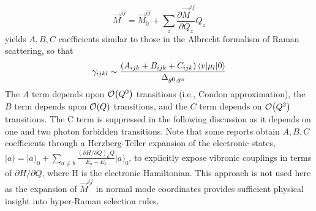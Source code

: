 \documentclass[aip, jcp, reprint, twocolumn]{revtex4-2}
\begin{document}
\begin{equation}
\vec{M}^{ij} = \vec{M}^{ij}_0 + \sum_z \frac{\partial\vec{M}^{ij}}{\partial Q_z} Q_z
\end{equation} 
yields $A, B, C$ coefficients similar to those in the Albrecht formalism of Raman scattering, \cite{Albrecht1961, Ziegler1988} so that
\begin{equation}
		\gamma_{ijkl} \sim \frac{(A_{ijk} + B_{ijk} + C_{ijk})\mel{v}{\mu_{l}}{0}} {\Delta_{g0,gv}}
\end{equation}
The $A$ term depends upon $\order{Q^0}$ transitions (i.e., Condon approximation), the $B$ term depends upon $\order{Q}$ transitions, and the $C$ term depends on $\order{Q^2}$ transitions. 
The C term is suppressed in the following discussion as it depends on one and two photon forbidden transitions. \cite{Ziegler1988, Neddersen1989, Bonang1992}
Note that some reports obtain $A, B, C$ coefficients through a Herzberg-Teller expansion of the electronic states, $|a) = |a)_0 + \sum_{a \neq b} \frac{(\partial H / \partial Q )_0  Q}{E_a - E_b} |a)_0$, to explicitly expose vibronic couplings in terms of $\partial H / \partial Q $, where H is the electronic Hamiltonian.\cite{HerzbergTeller1933, Petrov1985, Neddersen1989, Baranov1990}
This approach is not used here as the expansion of $\vec{M}^{ij}$ in normal mode coordinates provides sufficient physical insight into hyper-Raman selection rules. 
\end{document}
